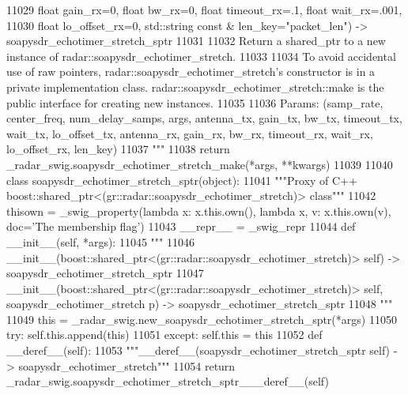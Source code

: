 \begin{DoxyCode}
{{{{{{{{{{{{{{{{{{{{{{{{{{{{{{{{{{{11029 \textcolor{stringliteral}{        float gain\_rx=0, float bw\_rx=0, float timeout\_rx=.1, float wait\_rx=.001, }
11030 \textcolor{stringliteral}{        float lo\_offset\_rx=0, std::string const & len\_key="packet\_len") -> soapysdr\_echotimer\_stretch\_sptr}
11031 \textcolor{stringliteral}{}
11032 \textcolor{stringliteral}{    Return a shared\_ptr to a new instance of radar::soapysdr\_echotimer\_stretch.}
11033 \textcolor{stringliteral}{}
11034 \textcolor{stringliteral}{    To avoid accidental use of raw pointers, radar::soapysdr\_echotimer\_stretch's constructor is in a
       private implementation class. radar::soapysdr\_echotimer\_stretch::make is the public interface for creating new
       instances.}
11035 \textcolor{stringliteral}{}
11036 \textcolor{stringliteral}{    Params: (samp\_rate, center\_freq, num\_delay\_samps, args, antenna\_tx, gain\_tx, bw\_tx, timeout\_tx,
       wait\_tx, lo\_offset\_tx, antenna\_rx, gain\_rx, bw\_rx, timeout\_rx, wait\_rx, lo\_offset\_rx, len\_key)}
11037 \textcolor{stringliteral}{    """}
11038   \textcolor{keywordflow}{return} \_radar\_swig.soapysdr\_echotimer\_stretch\_make(*args, **kwargs)
11039 
11040 \textcolor{keyword}{class }soapysdr_echotimer_stretch_sptr(object):
11041     \textcolor{stringliteral}{"""Proxy of C++ boost::shared\_ptr<(gr::radar::soapysdr\_echotimer\_stretch)> class"""}
11042     thisown = _swig_property(\textcolor{keyword}{lambda} x: x.this.own(), \textcolor{keyword}{lambda} x, v: x.this.own(v), doc=\textcolor{stringliteral}{'The membership flag'})
11043     \_\_repr\_\_ = \_swig\_repr
11044     \textcolor{keyword}{def }__init__(self, *args): 
11045         \textcolor{stringliteral}{"""}
11046 \textcolor{stringliteral}{        \_\_init\_\_(boost::shared\_ptr<(gr::radar::soapysdr\_echotimer\_stretch)> self) ->
       soapysdr\_echotimer\_stretch\_sptr}
11047 \textcolor{stringliteral}{        \_\_init\_\_(boost::shared\_ptr<(gr::radar::soapysdr\_echotimer\_stretch)> self,
       soapysdr\_echotimer\_stretch p) -> soapysdr\_echotimer\_stretch\_sptr}
11048 \textcolor{stringliteral}{        """}
11049         this = \_radar\_swig.new\_soapysdr\_echotimer\_stretch\_sptr(*args)
11050         \textcolor{keywordflow}{try}: self.this.append(this)
11051         \textcolor{keywordflow}{except}: self.this = this
11052     \textcolor{keyword}{def }__deref__(self):
11053         \textcolor{stringliteral}{"""\_\_deref\_\_(soapysdr\_echotimer\_stretch\_sptr self) -> soapysdr\_echotimer\_stretch"""}
11054         \textcolor{keywordflow}{return} \_radar\_swig.soapysdr\_echotimer\_stretch\_sptr\_\_\_deref\_\_(self)
}}}}}}}}}}}}}}}}}}}}}}}}}}}}}}}}}}}
\end{DoxyCode}
